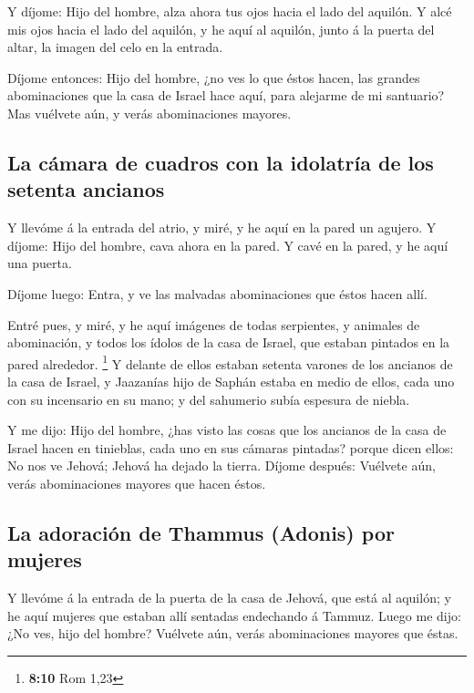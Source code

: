  Y díjome: Hijo del hombre, alza ahora tus ojos hacia el
lado del aquilón. Y alcé mis ojos hacia el lado del aquilón, y he aquí
al aquilón, junto á la puerta del altar, la imagen del celo en la
entrada.

 Díjome entonces: Hijo del hombre, ¿no ves lo que éstos
hacen, las grandes abominaciones que la casa de Israel hace aquí, para
alejarme de mi santuario? Mas vuélvete aún, y verás abominaciones
mayores.

\hypertarget{la-cuxe1mara-de-cuadros-con-la-idolatruxeda-de-los-setenta-ancianos}{%
\subsection{La cámara de cuadros con la idolatría de los setenta
ancianos}\label{la-cuxe1mara-de-cuadros-con-la-idolatruxeda-de-los-setenta-ancianos}}

 Y llevóme á la entrada del atrio, y miré, y he aquí en la
pared un agujero.  Y díjome: Hijo del hombre, cava ahora
en la pared. Y cavé en la pared, y he aquí una puerta.

 Díjome luego: Entra, y ve las malvadas abominaciones que
éstos hacen allí.

 Entré pues, y miré, y he aquí imágenes de todas
serpientes, y animales de abominación, y todos los ídolos de la casa de
Israel, que estaban pintados en la pared alrededor. \footnote{\textbf{8:10}
  Rom 1,23}  Y delante de ellos estaban setenta varones
de los ancianos de la casa de Israel, y Jaazanías hijo de Saphán estaba
en medio de ellos, cada uno con su incensario en su mano; y del
sahumerio subía espesura de niebla.

 Y me dijo: Hijo del hombre, ¿has visto las cosas que los
ancianos de la casa de Israel hacen en tinieblas, cada uno en sus
cámaras pintadas? porque dicen ellos: No nos ve Jehová; Jehová ha dejado
la tierra.  Díjome después: Vuélvete aún, verás
abominaciones mayores que hacen éstos.

\hypertarget{la-adoraciuxf3n-de-thammus-adonis-por-mujeres}{%
\subsection{La adoración de Thammus (Adonis) por
mujeres}\label{la-adoraciuxf3n-de-thammus-adonis-por-mujeres}}

 Y llevóme á la entrada de la puerta de la casa de
Jehová, que está al aquilón; y he aquí mujeres que estaban allí sentadas
endechando á Tammuz.  Luego me dijo: ¿No ves, hijo del
hombre? Vuélvete aún, verás abominaciones mayores que éstas.

